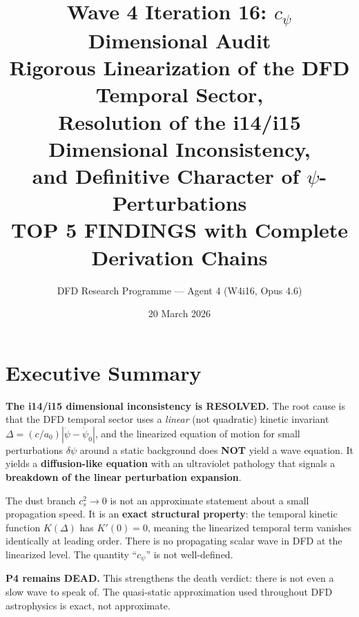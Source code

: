 \documentclass[11pt]{article}
\title{\textbf{Wave 4 Iteration 16: $c_\psi$ Dimensional Audit}\\[8pt]
{\large Rigorous Linearization of the DFD Temporal Sector,\\
Resolution of the i14/i15 Dimensional Inconsistency,\\
and Definitive Character of $\psi$-Perturbations}\\[4pt]
{\normalsize TOP 5 FINDINGS with Complete Derivation Chains}}
\author{DFD Research Programme --- Agent 4 (W4i16, Opus 4.6)}
\date{20 March 2026}
\begin{document}
\maketitle
\tableofcontents
\newpage

\section*{Executive Summary}

\begin{tcolorbox}[colback=red!5!white, colframe=red!60!black,
  title=\textbf{W4i16: $c_\psi$ DIMENSIONAL AUDIT --- RESOLUTION}]

\textbf{The i14/i15 dimensional inconsistency is RESOLVED.} The root cause
is that the DFD temporal sector uses a \emph{linear} (not quadratic)
kinetic invariant $\Delta = (c/a_0)|\dot\psi - \dot\psi_0|$, and the
linearized equation of motion for small perturbations $\delta\psi$
around a static background does \textbf{NOT} yield a wave equation.
It yields a \textbf{diffusion-like equation} with an ultraviolet
pathology that signals a \textbf{breakdown of the linear perturbation
expansion}.

The dust branch $c_s^2 \to 0$ is not an approximate statement about
a small propagation speed. It is an \textbf{exact structural property}:
the temporal kinetic function $K(\Delta)$ has $K'(0) = 0$, meaning
the linearized temporal term vanishes identically at leading order.
There is no propagating scalar wave in DFD at the linearized level.
The quantity ``$c_\psi$'' is not well-defined.

\textbf{P4 remains DEAD.} This strengthens the death verdict: there is
not even a slow wave to speak of. The quasi-static approximation used
throughout DFD astrophysics is exact, not approximate.

\end{tcolorbox}
\end{document}
